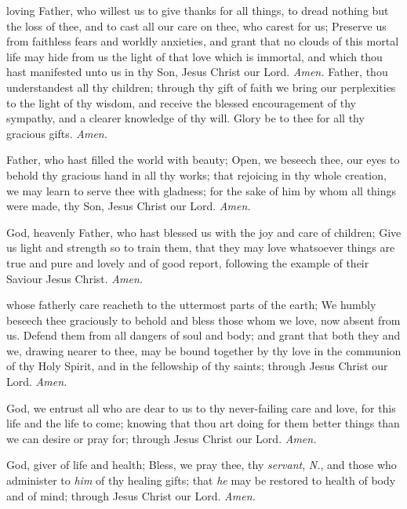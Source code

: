  loving Father, who willest us to give thanks for all things, to dread nothing but the loss of thee, and to cast all our care on thee, who carest for us; Preserve us from faithless fears and worldly anxieties, and grant that no clouds of this mortal life may hide from us the light of that love which is immortal, and which thou hast manifested unto us in thy Son, Jesus Christ our Lord. \textit{Amen.}
 Father, thou understandest all thy children; through thy gift of faith we bring our perplexities to the light of thy wisdom, and receive the blessed encouragement of thy sympathy, and a clearer knowledge of thy will. Glory be to thee for all thy gracious gifts. \textit{Amen.}

 Father, who hast filled the world with beauty; Open, we beseech thee, our eyes to behold thy gracious hand in all thy works; that rejoicing in thy whole creation, we may learn to serve thee with gladness; for the sake of him by whom all things were made, thy Son, Jesus Christ our Lord. \textit{Amen.}

 God, heavenly Father, who hast blessed us with the joy and care of children; Give us light and strength so to train them, that they may love whatsoever things are true and pure and lovely and of good report, following the example of their Saviour Jesus Christ. \textit{Amen.}

 whose fatherly care reacheth to the uttermost parts of the earth; We humbly beseech thee graciously to behold and bless those whom we love, now absent from us. Defend them from all dangers of soul and body; and grant that both they and we, drawing nearer to thee, may be bound together by thy love in the communion of thy Holy Spirit, and in the fellowship of thy saints; through Jesus Christ our Lord. \textit{Amen.}

 God, we entrust all who are dear to us to thy never-failing care and love, for this life and the life to come; knowing that thou art doing for them better things than we can desire or pray for; through Jesus Christ our Lord. \textit{Amen.}

 God, giver of life and health; Bless, we pray thee, thy \textit{servant}, \textit{N.}, and those who administer to \textit{him} of thy healing gifts; that \textit{he} may be restored to health of body and of mind; through Jesus Christ our Lord. \textit{Amen.}

